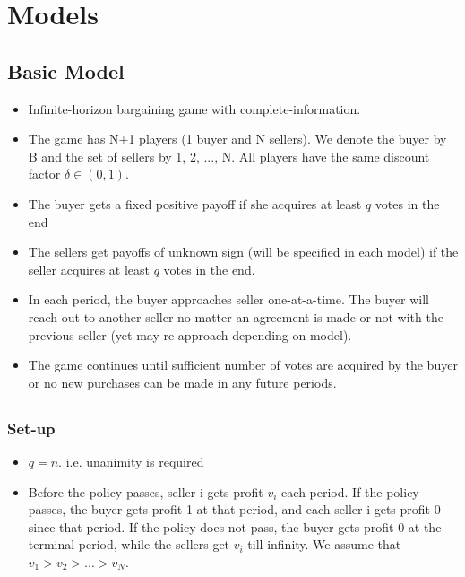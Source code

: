 \documentclass[pdflatex]{beamer}
\begin{document}
\section{Models}

\subsection{Basic Model}
\begin{frame}
\begin{itemize}
	\item Infinite-horizon bargaining game with complete-information.
	\item The game has N+1 players (1 buyer and N sellers). We denote the buyer by B and the set of sellers by {1, 2, ..., N}. All players have the same discount factor $\delta \in (0, 1)$.
	\item The buyer gets a fixed positive payoff if she acquires at least $q$ votes in the end
	\item The sellers get payoffs of unknown sign (will be specified in each model) if the seller acquires at least $q$ votes in the end.
	\item In each period, the buyer approaches seller one-at-a-time. The buyer will reach out to another seller no matter an agreement is made or not with the previous seller (yet may re-approach depending on model). 
	\item The game continues until sufficient number of votes are acquired by the buyer or no new purchases can be made in any future periods.
\end{itemize}
\end{frame}

\subsection{\cite{Xiao}}

\begin{frame}
\frametitle{Set-up}
\begin{itemize}
	\item $q=n$. i.e. unanimity is required
	\item Before the policy passes, seller i gets profit $v_i$ each period. If the policy passes, the buyer gets profit 1 at that period, and each seller i gets profit 0 since that period. If the policy does not pass, the buyer gets profit 0 at the terminal period, while the sellers get $v_i$ till infinity. We assume that $v_1 > v_2 > ... > v_N$.
	
\end{itemize}
\end{frame}
\end{document}
